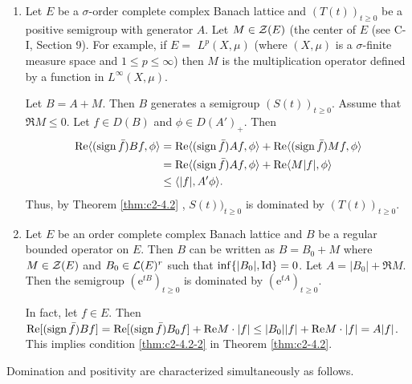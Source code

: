 \begin{example}\label{ex:c2-4.4} 
\begin{enumerate}[\upshape (i), wide, labelindent=.5em] %
\item \label{ex:c2-4.4-1}
Let $E$ be a $\sigma$-order complete complex Banach lattice and $(T(t))_{t \geq 0}$ be a positive semigroup with generator $A$. 
Let $M \in \mathcal{Z}(E)$ (the center of $E$ (see C-I, Section 9). 
For example, if $E =$ $L^{p}(X,\mu)$ (where $(X,\mu)$ is a $\sigma$-finite measure space and $1 \leq p \leq \infty$) then $M$ is the multiplication operator defined by a function in $L^{\infty}(X,\mu)$.

Let $B = A + M$. Then $B$ generates a semigroup $(S(t))_{t \geq 0}$.
Assume that $\Re M \leq 0$. Let $f \in D(B)$ and $\phi \in D(A')_{+}$. Then
\begin{align*}
\mathop{}\!\mathrm{Re}\langle(\operatorname{sign}  \bar{f})Bf,\phi\rangle &= \mathop{}\!\mathrm{Re}\langle(\operatorname{sign}  \bar{f})Af,\phi\rangle + \mathop{}\!\mathrm{Re}\langle(\operatorname{sign}  \bar{f})Mf,\phi\rangle\\
&= \mathop{}\!\mathrm{Re}\langle(\operatorname{sign}  \bar{f})Af,\phi\rangle + \mathop{}\!\mathrm{Re}\langle M|f|,\phi\rangle\\
&\leq \langle|f|,A'\phi\rangle.
\end{align*}
Thus, by Theorem \ref{thm:c2-4.2}  , $S(t))_{t \geq 0}$ is dominated by $(T(t))_{t \geq 0}$.
\item \label{ex:c2-4.4-2}
Let $E$ be an order complete complex Banach lattice and $B$ be a regular bounded operator on $E$. 
Then $B$ can be written as $B = B_{0} + M$ where $M \in \mathcal{Z}(E)$ and $B_{0} \in \mathcal{L}(E)^{r}$ such that $\inf \{|B_{0}|, \operatorname{Id}\} = 0$.
Let $A = |B_{0}| + \Re  M$. 
Then the semigroup $(\mathrm{e}^{tB})_{t \geq 0}$ is dominated by $(\mathrm{e}^{tA})_{t \geq 0}$.

In fact, let $f \in E$. Then \\
$\mathop{}\!\mathrm{Re}[(\operatorname{sign}  \bar{f})Bf] = \mathop{}\!\mathrm{Re}[(\operatorname{sign} \bar{f})B_{0}f] + \mathop{}\!\mathrm{Re} M \cdot |f| \leq |B_{0}||f| + \mathop{}\!\mathrm{Re} M \cdot |f| = A|f|$. \\
This implies condition \ref{thm:c2-4.2-2} in Theorem \ref{thm:c2-4.2}.
\end{enumerate}
\end{example}

Domination and positivity are characterized simultaneously as
follows.

